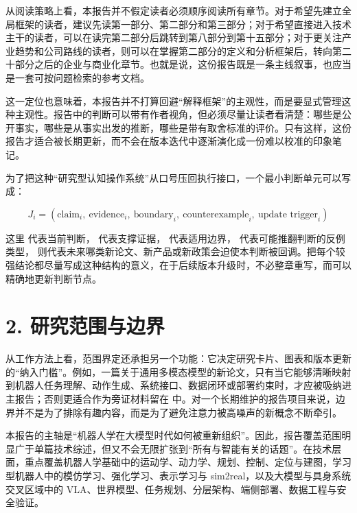 从阅读策略上看，本报告并不假定读者必须顺序阅读所有章节。对于希望先建立全局框架的读者，建议先读第一部分、第二部分和第三部分；对于希望直接进入技术主干的读者，可以在读完第二部分后跳转到第八部分到第十五部分；对于更关注产业趋势和公司路线的读者，则可以在掌握第二部分的定义和分析框架后，转向第二十部分之后的企业与商业化章节。也就是说，这份报告既是一条主线叙事，也应当是一套可按问题检索的参考文档。

这一定位也意味着，本报告并不打算回避“解释框架”的主观性，而是要显式管理这种主观性。报告中的判断可以带有作者视角，但必须尽量让读者看清楚：哪些是公开事实，哪些是从事实出发的推断，哪些是带有取舍标准的评价。只有这样，这份报告才适合被长期更新，而不会在版本迭代中逐渐演化成一份难以校准的印象笔记。

为了把这种“研究型认知操作系统”从口号压回执行接口，一个最小判断单元可以写成：

\begingroup
\scriptsize
\begin{equation*}
J_i = (\text{claim}_i,\ \text{evidence}_i,\ \text{boundary}_i,\ \text{counterexample}_i,\ \text{update trigger}_i)
\end{equation*}
\endgroup

这里 \texttt{} 代表当前判断，\texttt{} 代表支撑证据，\texttt{} 代表适用边界，\texttt{} 代表可能推翻判断的反例类型，\texttt{} 则代表未来哪类新论文、新产品或新政策会迫使本判断被回调。把每个较强结论都尽量写成这种结构的意义，在于后续版本升级时，不必整章重写，而可以精确地更新判断节点。

\section*{2. 研究范围与边界}

从工作方法上看，范围界定还承担另一个功能：它决定研究卡片、图表和版本更新的“纳入门槛”。例如，一篇关于通用多模态模型的新论文，只有当它能够清晰映射到机器人任务理解、动作生成、系统接口、数据闭环或部署约束时，才应被吸纳进主报告；否则更适合作为旁证材料留在  中。对一个长期维护的报告项目来说，边界并不是为了排除有趣内容，而是为了避免注意力被高噪声的新概念不断牵引。

本报告的主轴是“机器人学在大模型时代如何被重新组织”。因此，报告覆盖范围明显广于单篇技术综述，但又不会无限扩张到“所有与智能有关的话题”。在技术层面，重点覆盖机器人学基础中的运动学、动力学、规划、控制、定位与建图，学习型机器人中的模仿学习、强化学习、表示学习与 sim2real，以及大模型与具身系统交叉区域中的 VLA、世界模型、任务规划、分层架构、端侧部署、数据工程与安全验证。

